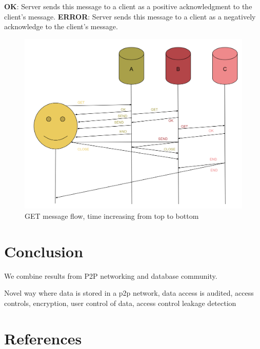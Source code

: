 \documentclass[preprint,10pt]{elsarticle}
\newcommand{\fscale}[1]{#1\linewidth}
\theoremstyle{definition}
\begin{document}
\textbf{OK}: Server sends this message to a client as a positive acknowledgment to the client's message.
\newline
\newline
\textbf{ERROR}: Server sends this message to a client as a negatively acknowledge to the client's message.
\begin{figure}[h!] \centering
	\includegraphics[width=\fscale{1}]{mx.png}
	\caption{GET message flow, time increasing from top to bottom}
	\label{fig:mx}
\end{figure}

\section{Conclusion}
We combine results from P2P networking and database community.

Novel way where data is stored in a p2p network, data access is audited, access controls, encryption, user control of data, access control leakage detection

\section{References}



\end{document}
